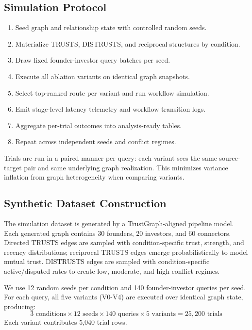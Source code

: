 \documentclass[conference]{IEEEtran}
\begin{document}
\subsection{Simulation Protocol}
\begin{enumerate}
    \item Seed graph and relationship state with controlled random seeds.
    \item Materialize TRUSTS, DISTRUSTS, and reciprocal structures by condition.
    \item Draw fixed founder-investor query batches per seed.
    \item Execute all ablation variants on identical graph snapshots.
    \item Select top-ranked route per variant and run workflow simulation.
    \item Emit stage-level latency telemetry and workflow transition logs.
    \item Aggregate per-trial outcomes into analysis-ready tables.
    \item Repeat across independent seeds and conflict regimes.
\end{enumerate}

Trials are run in a paired manner per query: each variant sees the same source-target pair and same underlying graph realization. This minimizes variance inflation from graph heterogeneity when comparing variants.

\subsection{Synthetic Dataset Construction}
The simulation dataset is generated by a TrustGraph-aligned pipeline model. Each generated graph contains 30 founders, 20 investors, and 60 connectors. Directed TRUSTS edges are sampled with condition-specific trust, strength, and recency distributions; reciprocal TRUSTS edges emerge probabilistically to model mutual trust. DISTRUSTS edges are sampled with condition-specific active/disputed rates to create low, moderate, and high conflict regimes.

We use 12 random seeds per condition and 140 founder-investor queries per seed. For each query, all five variants (V0-V4) are executed over identical graph state, producing:
\begin{equation}
3 \text{ conditions} \times 12 \text{ seeds} \times 140 \text{ queries} \times 5 \text{ variants} = 25{,}200 \text{ trials}
\end{equation}
Each variant contributes 5,040 trial rows.
\end{document}
